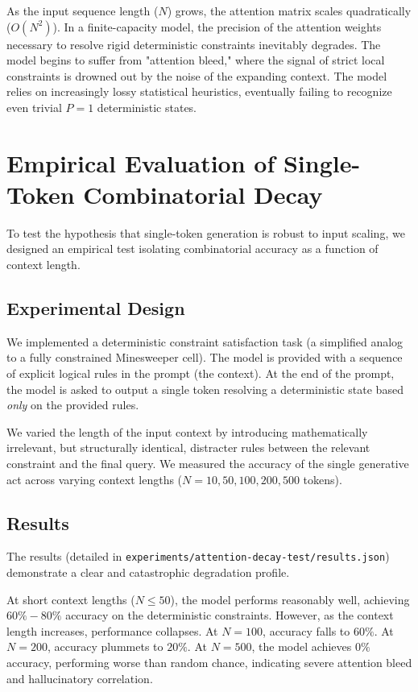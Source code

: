 \documentclass[12pt,a4paper]{article}
\begin{document}
As the input sequence length ($N$) grows, the attention matrix scales quadratically ($O(N^2)$). In a finite-capacity model, the precision of the attention weights necessary to resolve rigid deterministic constraints inevitably degrades. The model begins to suffer from "attention bleed," where the signal of strict local constraints is drowned out by the noise of the expanding context. The model relies on increasingly lossy statistical heuristics, eventually failing to recognize even trivial $P=1$ deterministic states.

\section{Empirical Evaluation of Single-Token Combinatorial Decay}
\label{sec:empirical_eval}

To test the hypothesis that single-token generation is robust to input scaling, we designed an empirical test isolating combinatorial accuracy as a function of context length.

\subsection{Experimental Design}
\label{sec:exp_design}

We implemented a deterministic constraint satisfaction task (a simplified analog to a fully constrained Minesweeper cell). The model is provided with a sequence of explicit logical rules in the prompt (the context). At the end of the prompt, the model is asked to output a single token resolving a deterministic state based \emph{only} on the provided rules.

We varied the length of the input context by introducing mathematically irrelevant, but structurally identical, distracter rules between the relevant constraint and the final query. We measured the accuracy of the single generative act across varying context lengths ($N=10, 50, 100, 200, 500$ tokens).

\subsection{Results}
\label{sec:results}

The results (detailed in \texttt{experiments/attention-decay-test/results.json}) demonstrate a clear and catastrophic degradation profile.

At short context lengths ($N \le 50$), the model performs reasonably well, achieving $60\% - 80\%$ accuracy on the deterministic constraints. However, as the context length increases, performance collapses. At $N=100$, accuracy falls to $60\%$. At $N=200$, accuracy plummets to $20\%$. At $N=500$, the model achieves $0\%$ accuracy, performing worse than random chance, indicating severe attention bleed and hallucinatory correlation.
\end{document}

